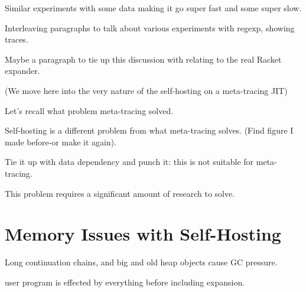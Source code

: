 			\begin{show-experiment}
				Similar experiments with some data making it go super fast and some super slow.
			\end{show-experiment}

			\begin{paragraph-here}
				Interleaving paragraphs to talk about various experiments with regexp, showing traces.
			\end{paragraph-here}

			\begin{paragraph-here}
				Maybe a paragraph to tie up this discussion with relating to the real Racket expander.
			\end{paragraph-here}

			(We move here into the very nature of the self-hosting on a meta-tracing JIT)

			\begin{paragraph-here}
				Let's recall what problem meta-tracing solved.
			\end{paragraph-here}

			\begin{paragraph-here}
				Self-hosting is a different problem from what meta-tracing solves. (Find figure I made before-or make it again).
			\end{paragraph-here}

			\begin{paragraph-here}
				Tie it up with data dependency and punch it: this is not suitable for meta-tracing.
			\end{paragraph-here}

			\begin{paragraph-here}
				This problem requires a significant amount of research to solve.
			\end{paragraph-here}


	\section{Memory Issues with Self-Hosting}
	\label{section:memory}

		\begin{mainpoint}
			Long continuation chains, and big and old heap objects cause GC pressure.
		\end{mainpoint}

		\begin{paragraph-here}
			user program is effected by everything before including expansion.
		\end{paragraph-here}

